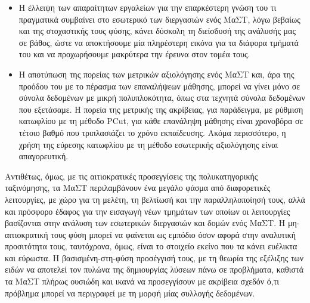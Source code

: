 \begin{itemize}
\item Η έλλειψη των απαραίτητων εργαλείων για την επαρκέστερη γνώση του τι πραγματικά συμβαίνει στο εσωτερικό των διεργασιών ενός ΜαΣΤ, λόγω βεβαίως και της στοχαστικής τους φύσης, κάνει δύσκολη τη διείσδυσή της ανάλυσής μας σε βάθος, ώστε να αποκτήσουμε μία πληρέστερη εικόνα για τα διάφορα τμήματά του και να προχωρήσουμε μακρύτερα την έρευνα στον τομέα τους.

\item Η αποτύπωση της πορείας των μετρικών αξιολόγησης ενός ΜαΣΤ και, άρα της προόδου του με το πέρασμα των επαναλήψεων μάθησης, μπορεί να γίνει μόνο σε σύνολα δεδομένων με μικρή πολυπλοκότητα, όπως στα τεχνητά σύνολα δεδομένων που εξετάσαμε. Η πορεία της μετρικής της ακρίβειας, για παράδειγμα, με ρύθμιση κατωφλίου με τη μέθοδο PCut, για κάθε επανάληψη μάθησης είναι χρονοβόρα σε τέτοιο βαθμό που τριπλασιάζει το χρόνο εκπαίδευσης. Ακόμα περισσότερο, η χρήση της εύρεσης κατωφλίου με τη μέθοδο εσωτερικής αξιολόγησης είναι απαγορευτική.

\end{itemize}



Αντιθέτως, όμως, με τις αιτιοκρατικές προσεγγίσεις της πολυκατηγορικής ταξινόμησης, τα ΜαΣΤ περιλαμβάνουν ένα μεγάλο φάσμα από διαφορετικές λειτουργίες, με χώρο για τη μελέτη, τη βελτίωσή και την παραλληλοποίησή τους, αλλά και πρόσφορο έδαφος για την εισαγωγή νέων τμημάτων των οποίων οι λειτουργίες βασίζονται στην ανάλυση των εσωτερικών διεργασιών και δομών ενός ΜαΣΤ. Η μη-αιτιοκρατική τους φύση μπορεί να φαίνεται ως εμπόδιο όσον αφορά στην αναλυτική προσιτότητα τους, ταυτόχρονα, όμως, είναι το στοιχείο εκείνο που τα κάνει ευέλικτα και εύρωστα. Η βασισμένη-στη-φύση προσέγγισή τους, με τη θεωρία της εξέλιξης των ειδών να αποτελεί τον πυλώνα της δημιουργίας λύσεων πάνω σε προβλήματα, καθιστά τα ΜαΣΤ πλήρως ουσιώδη και ικανά να προσεγγίσουν με ακρίβεια σχεδόν ό,τι πρόβλημα μπορεί να περιγραφεί με τη μορφή μίας συλλογής δεδομένων.
